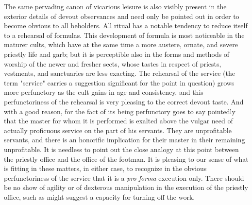 \documentclass[12pt]{report}
\begin{document}
The same pervading canon of vicarious leisure is also visibly present in
the exterior details of devout observances and need only be pointed out
in order to become obvious to all beholders. All ritual has a notable
tendency to reduce itself to a rehearsal of formulas. This development
of formula is most noticeable in the maturer cults, which have at the
same time a more austere, ornate, and severe priestly life and garb; but
it is perceptible also in the forms and methods of worship of the newer
and fresher sects, whose tastes in respect of priests, vestments, and
sanctuaries are less exacting. The rehearsal of the service (the term
"service" carries a suggestion significant for the point in question)
grows more perfunctory as the cult gains in age and consistency, and
this perfunctoriness of the rehearsal is very pleasing to the correct
devout taste. And with a good reason, for the fact of its being
perfunctory goes to say pointedly that the master for whom it is
performed is exalted above the vulgar need of actually proficuous
service on the part of his servants. They are unprofitable servants, and
there is an honorific implication for their master in their remaining
unprofitable. It is needless to point out the close analogy at this
point between the priestly office and the office of the footman. It is
pleasing to our sense of what is fitting in these matters, in either
case, to recognize in the obvious perfunctoriness of the service that it
is a \emph{pro forma} execution only. There should be no show of agility or of
dexterous manipulation in the execution of the priestly office, such as
might suggest a capacity for turning off the work.
\end{document}
